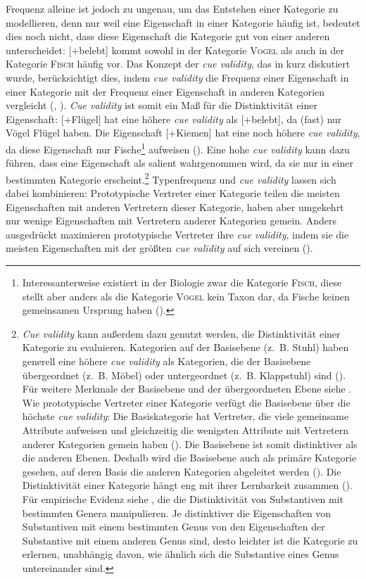 Frequenz alleine ist jedoch zu ungenau, um das Entstehen einer Kategorie zu modellieren, denn nur weil eine Eigenschaft in einer Kategorie häufig ist, bedeutet dies noch nicht, dass diese Eigenschaft die Kategorie gut von einer anderen unterscheidet: [+belebt] kommt sowohl in der Kategorie \textsc{Vogel} als auch in der Kategorie \textsc{Fisch} häufig vor. Das Konzept der \textit{cue validity}, das in  kurz diskutiert wurde, berücksichtigt dies, indem \textit{cue validity} die Frequenz einer Eigenschaft in einer Kategorie mit der Frequenz einer Eigenschaft in anderen Kategorien vergleicht (\cite[575]{Rosch.1975c}, \cite[52--53]{Kleiber.1993}). \textit{Cue validity} ist somit ein Maß für die Distinktivität einer Eigenschaft: [+Flügel] hat eine höhere \textit{cue validity} als [+belebt], da (fast) nur Vögel Flügel haben. Die Eigenschaft [+Kiemen] hat eine noch höhere \textit{cue validity}, da diese Eigenschaft nur Fische\footnote{Interessanterweise existiert in der Biologie zwar die Kategorie \textsc{Fisch}, diese stellt aber anders als die Kategorie \textsc{Vögel} kein Taxon dar, da Fische keinen gemeinsamen Ursprung haben (\cite[3]{Helfman.2009}).} aufweisen (\cite[52--53]{Lakoff.1987}). Eine hohe \textit{cue validity} kann dazu führen, dass eine Eigenschaft als salient wahrgenommen wird, da sie nur in einer bestimmten Kategorie erscheint.\footnote{\textit{Cue validity} kann außerdem dazu genutzt werden, die Distinktivität einer Kategorie zu evaluieren. Kategorien auf der Basisebene (z.~B. Stuhl) haben generell eine höhere \textit{cue validity} als Kategorien, die der Basisebene übergeordnet (z.~B. Möbel) oder untergeordnet (z.~B. Klappstuhl) sind (\cite[428]{Rosch.1976}). Für weitere Merkmale der Basisebene und der übergeordneten Ebene siehe \textcite[51--52]{Lakoff.1987}. Wie prototypische Vertreter einer Kategorie verfügt die Basisebene über die höchste \textit{cue validity}: Die Basiskategorie hat Vertreter, die viele gemeinsame Attribute aufweisen und gleichzeitig die wenigsten Attribute mit Vertretern anderer Kategorien gemein haben (\cite[64]{Kleiber.1993}). Die Basisebene ist somit distinktiver als die anderen Ebenen. Deshalb wird die Basisebene auch als primäre Kategorie gesehen, auf deren Basis die anderen Kategorien abgeleitet werden (\cite[13]{Lakoff.1987}). Die Distinktivität einer Kategorie hängt eng mit ihrer Lernbarkeit zusammen (\cite[153]{Ellis.2002b}). Für empirische Evidenz siehe \textcite{Taraban.1996}, die die Distinktivität von Substantiven mit bestimmten Genera manipulieren. Je distinktiver die Eigenschaften von Substantiven mit einem bestimmten Genus von den Eigenschaften der Substantive mit einem anderen Genus sind, desto leichter ist die Kategorie zu erlernen, unabhängig davon, wie ähnlich sich die Substantive eines Genus untereinander sind.}
Typenfrequenz und \textit{cue validity} lassen sich dabei kombinieren: Prototypische Vertreter einer Kategorie teilen die meisten Eigenschaften mit anderen Vertretern dieser Kategorie, haben aber umgekehrt nur wenige Eigenschaften mit Vertretern anderer Kategorien gemein. Anders ausgedrückt maximieren prototypische Vertreter ihre \textit{cue validity}, indem sie die meisten Eigenschaften mit der größten \textit{cue validity} auf sich vereinen (\cite[564]{Taylor.2015}).

